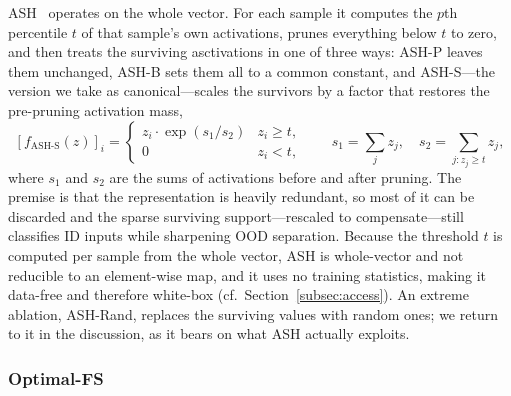 \documentclass[a4paper]{article}
\begin{document}
ASH~\citep{ash} operates on the whole vector. For each sample it computes the $p$th
percentile $t$ of that sample's own activations, prunes everything below $t$ to
zero, and then treats the surviving asctivations in one of three ways: ASH-P leaves
them unchanged, ASH-B sets them all to a common constant, and ASH-S---the version we
take as canonical---scales the survivors by a factor that restores the pre-pruning
activation mass,
\begin{equation}
\label{eq:ash}
[f_{\mathrm{ASH\text{-}S}}(z)]_{i} =
\begin{cases}
z_i \cdot \exp\!\left( s_1 / s_2 \right) & z_i \geq t,\\[2pt]
0 & z_i < t,
\end{cases}
\qquad
s_1 = \sum_j z_j, \quad s_2 = \sum_{j : z_j \geq t} z_j ,
\end{equation}
where $s_1$ and $s_2$ are the sums of activations before and after pruning. The
premise is that the representation is heavily redundant, so most of it can be
discarded and the sparse surviving support---rescaled to compensate---still
classifies ID inputs while sharpening OOD separation. Because the threshold $t$ is
computed per sample from the whole vector, ASH is whole-vector and not reducible to
an element-wise map, and it uses no training statistics, making it data-free and
therefore white-box (cf.\ Section~\ref{subsec:access}). An extreme ablation, ASH-Rand, replaces the
surviving values with random ones; we return to it in the discussion, as it bears on
what ASH actually exploits.

\subsubsection{Optimal-FS}
\label{subsec:optfs}
\end{document}
